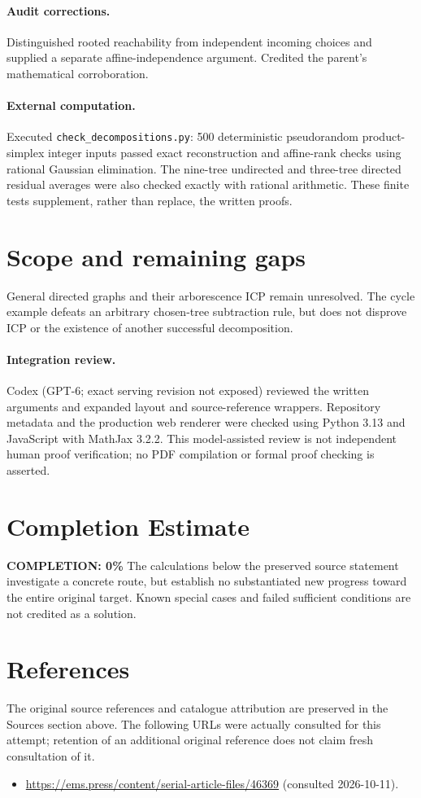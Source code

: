 \documentclass[11pt]{article}
\begin{document}
\paragraph{Audit corrections.} Distinguished rooted reachability from independent incoming choices and supplied a separate affine-independence argument. Credited the parent's mathematical corroboration.
\paragraph{External computation.} Executed \texttt{check\_decompositions.py}: 500 deterministic pseudorandom product-simplex integer inputs passed exact reconstruction and affine-rank checks using rational Gaussian elimination. The nine-tree undirected and three-tree directed residual averages were also checked exactly with rational arithmetic. These finite tests supplement, rather than replace, the written proofs.
\section{Scope and remaining gaps}
General directed graphs and their arborescence ICP remain unresolved. The cycle example defeats an arbitrary chosen-tree subtraction rule, but does not disprove ICP or the existence of another successful decomposition.
\paragraph{Integration review.} Codex (GPT-6; exact serving revision not exposed) reviewed the written arguments and expanded layout and source-reference wrappers. Repository metadata and the production web renderer were checked using Python 3.13 and JavaScript with MathJax 3.2.2. This model-assisted review is not independent human proof verification; no PDF compilation or formal proof checking is asserted.

\section{Completion Estimate}
\noindent\textbf{COMPLETION: 0\%}
The calculations below the preserved source statement investigate a concrete route,
but establish no substantiated new progress toward the entire original target.
Known special cases and failed sufficient conditions are not credited as a solution.
\section{References}
The original source references and catalogue attribution are preserved in the
Sources section above. The following URLs were actually consulted for this attempt;
retention of an additional original reference does not claim fresh consultation of it.
\begin{itemize}
\item \url{https://ems.press/content/serial-article-files/46369} (consulted 2026-10-11). 
\end{itemize}
\end{document}
